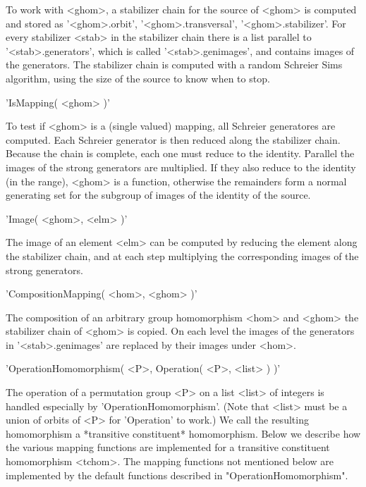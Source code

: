 To work with <ghom>,  a stabilizer  chain for  the source  of  <ghom>  is
computed    and   stored    as   '<ghom>.orbit',    '<ghom>.transversal',
'<ghom>.stabilizer'.  For every stabilizer <stab> in the stabilizer chain
there  is  a  list  parallel  to  '<stab>.generators',  which  is  called
'<stab>.genimages',   and   contains  images   of  the  generators.   The
stabilizer chain is computed with a random Schreier Sims algorithm, using
the size of the source to know when to stop.

\vspace{5mm}
'IsMapping( <ghom> )'%

To test  if <ghom> is a (single valued) mapping, all Schreier generatores
are  computed.   Each  Schreier  generator  is  then  reduced  along  the
stabilizer chain.  Because the chain is complete, each one must reduce to
the  identity.   Parallel  the  images  of  the  strong   generators  are
multiplied.  If they also reduce to the identity (in  the range),  <ghom>
is a function, otherwise the remainders form  a normal generating set for
the subgroup of images of the identity of the source.

\vspace{5mm}
'Image( <ghom>, <elm> )'%

The  image of  an element <elm>  can be computed by reducing  the element
along   the   stabilizer  chain,  and   at  each  step   multiplying  the
corresponding images of the strong generators.

\vspace{5mm}
'CompositionMapping( <hom>, <ghom> )'%

The composition of  an  arbitrary group homomorphism <hom> and <ghom> the
stabilizer  chain  of  <ghom> is copied.  On each level the images of the
generators  in '<stab>.genimages'  are  replaced  by  their images  under
<hom>.

\vspace{7mm}
'OperationHomomorphism( <P>, Operation( <P>, <list> ) )'%

The operation of a permutation group <P> on  a list <list> of integers is
handled especially by 'OperationHomomorphism'.  (Note that <list> must be
a union of orbits of <P> for 'Operation' to work.)  We call the resulting
homomorphism  a *transitive constituent* homomorphism.  Below we describe
how  the  various  mapping  functions  are implemented  for  a transitive
constituent homomorphism <tchom>.   The  mapping functions  not mentioned
below   are  implemented  by   the   default   functions   described   in
"OperationHomomorphism".

